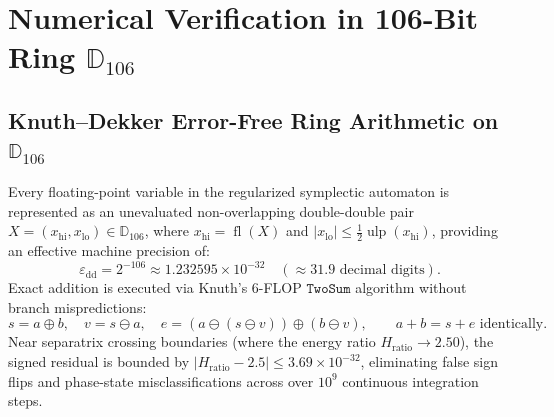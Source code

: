 \documentclass[11pt,a4paper,reqno]{article}
\theoremstyle{plain}
\theoremstyle{definition}
\theoremstyle{remark}
\numberwithin{equation}{section}
\newcommand{\Ddd}{\mathbb{D}_{106}}
\begin{document}
\section{Numerical Verification in 106-Bit Ring \texorpdfstring{$\Ddd$}{D106}}
\label{sec:numerical_verification_d106}

\subsection{Knuth--Dekker Error-Free Ring Arithmetic on \texorpdfstring{$\Ddd$}{D106}}
\label{subsec:knuth_dekker_d106}
Every floating-point variable in the regularized symplectic automaton is represented as an unevaluated non-overlapping double-double pair $X = (x_{\mathrm{hi}}, x_{\mathrm{lo}}) \in \Ddd$, where $x_{\mathrm{hi}} = \operatorname{fl}(X)$ and $|x_{\mathrm{lo}}| \le \frac{1}{2} \operatorname{ulp}(x_{\mathrm{hi}})$, providing an effective machine precision of:
\begin{equation}
  \varepsilon_{\mathrm{dd}} = 2^{-106} \approx 1.232595 \times 10^{-32} \quad (\approx 31.9 \text{ decimal digits}).
\end{equation}
Exact addition is executed via Knuth's 6-FLOP $\texttt{TwoSum}$ algorithm without branch mispredictions:
\begin{equation}
  s = a \oplus b, \quad v = s \ominus a, \quad e = (a \ominus (s \ominus v)) \oplus (b \ominus v), \qquad a + b = s + e \text{ identically}.
\end{equation}
Near separatrix crossing boundaries (where the energy ratio $H_{\mathrm{ratio}} \to 2.50$), the signed residual is bounded by $|H_{\mathrm{ratio}} - 2.5| \le 3.69 \times 10^{-32}$, eliminating false sign flips and phase-state misclassifications across over $10^9$ continuous integration steps.
\end{document}
